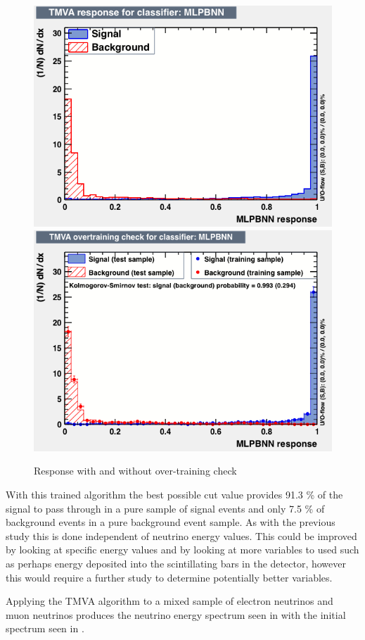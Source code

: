 \begin{figure}[h!]
\centering
\includegraphics[width=.49\textwidth]{figures/neutrinoTMVA/mva_MLPBNN.png}
\includegraphics[width=.49\textwidth]{figures/neutrinoTMVA/overtrain_MLPBNN.png}
\caption{Response with and without over-training check}
\label{fig:TMVANeuresponce}
\end{figure}

With this trained algorithm the best possible cut value provides 91.3 \% of the signal to pass through in a pure sample of signal events and only 7.5 \% of background events in a pure background event sample. As with the previous study this is done independent of neutrino energy values. This could be improved by looking at specific energy values and by looking at more variables to used such as perhaps energy deposited into the scintillating bars in the detector, however this would require a further study to determine potentially better variables.

Applying the TMVA algorithm to a mixed sample of electron neutrinos and muon neutrinos produces the neutrino energy spectrum seen in  with the initial spectrum seen in .


